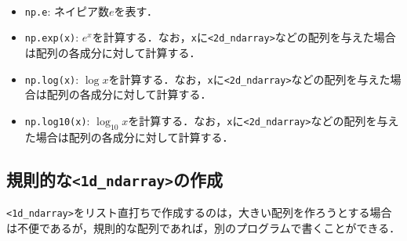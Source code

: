 \begin{gram}　
\begin{itemize}
\item \texttt{np.e}: ネイピア数$e$を表す．
\item \texttt{np.exp(x)}: $e^x$を計算する．なお，\texttt{x}に\texttt{<2d\_ndarray>}などの配列を与えた場合は配列の各成分に対して計算する．
\item \texttt{np.log(x)}: $\log x$を計算する．なお，\texttt{x}に\texttt{<2d\_ndarray>}などの配列を与えた場合は配列の各成分に対して計算する．
\item \texttt{np.log10(x)}: $\log_{10} x$を計算する．なお，\texttt{x}に\texttt{<2d\_ndarray>}などの配列を与えた場合は配列の各成分に対して計算する．
\end{itemize}
\end{gram}
\begin{cod}[\texttt{num11.py}]　
}]{code/num11.py}
\vspace{-10pt}
\begin{lstlisting}
e^x=[1.51542622e+01 3.00000000e+00 2.20264658e+04 1.61142883e+00]
log(x)=[ 1.          0.09404783  2.30258509 -0.73998462]
10^x=[5.22735300e+02 1.25490916e+01 1.00000000e+10 3.00000000e+00]
log10(x)=[ 0.43429448  0.04084445  1.         -0.32137124]
\end{lstlisting}
\end{cod}
\vspace{-10pt}

\subsection{規則的な\texttt{<1d\_ndarray>}の作成}
\texttt{<1d\_ndarray>}をリスト直打ちで作成するのは，大きい配列を作ろうとする場合は不便であるが，規則的な配列であれば，別のプログラムで書くことができる．

